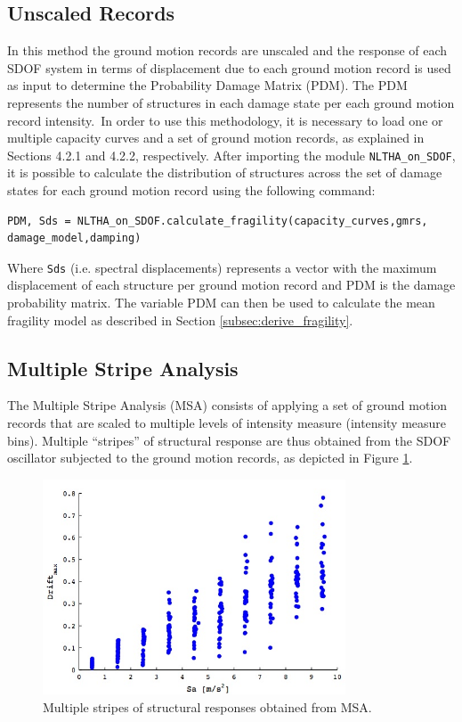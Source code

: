 \subsection{Unscaled Records}
\label{subsec:NLTHA-unscaled}

In this method the ground motion records are unscaled and the response of each SDOF system in terms of displacement due to each ground motion record is used as input to determine the Probability Damage Matrix (PDM). The PDM represents the number of structures in each damage state per each ground motion record intensity.\
In order to use this methodology, it is necessary to load one or multiple capacity curves and a set of ground motion records, as explained in Sections 4.2.1 and 4.2.2, respectively. After importing the module \verb=NLTHA_on_SDOF=, it is possible to calculate the distribution of structures across the set of damage states for each ground motion record using the following command:

\begin{Verbatim}[frame=single, commandchars=\\\{\}, samepage=true]
PDM, Sds = NLTHA_on_SDOF.calculate_fragility(capacity_curves,gmrs,
damage_model,damping)
\end{Verbatim}

Where \verb=Sds= (i.e. spectral displacements) represents a vector with the maximum displacement of each structure per ground motion record and PDM is the damage probability matrix. The variable PDM can then be used to calculate the mean fragility model as described in Section \ref{subsec:derive_fragility}.

\subsection{Multiple Stripe Analysis}
\label{subsec:NLTHA-MSA}
The Multiple Stripe Analysis (MSA) consists of applying a set of ground motion records that are scaled to multiple levels of intensity measure (intensity measure bins). Multiple “stripes” of structural response are thus obtained from the SDOF oscillator subjected to the ground motion records, as depicted in Figure \ref{fig:msa}.\

\begin{figure}[htb]
  \centering
      \includegraphics[width=9cm]{figures/MSA_example.jpg}
  \caption{Multiple stripes of structural responses obtained from MSA.}
  \label{fig:msa}
\end{figure}

